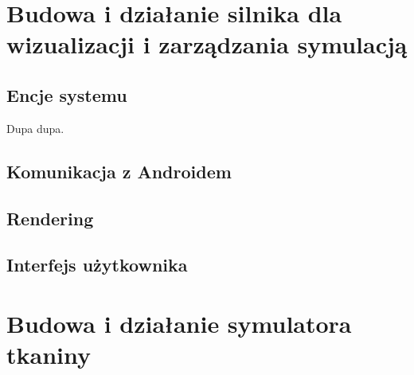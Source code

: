 	\section{Budowa i działanie silnika dla wizualizacji i zarządzania symulacją}
	\label{t:praktyka:silnik}
	
	
		\subsection{Encje systemu}
		\label{t:praktyka:silnik:komponent}
		
		
		Dupa dupa.
		
		\subsection{Komunikacja z Androidem}
		\label{t:praktyka:silnik:andro}
		
		
		\subsection{Rendering}
		\label{t:praktyka:silnik:render}
		
		
		\subsection{Interfejs użytkownika}
		\label{t:praktyka:silnik:gui}
		
	
	
	\section{Budowa i działanie symulatora tkaniny}
	\label{t:praktyka:symulacja}
	
